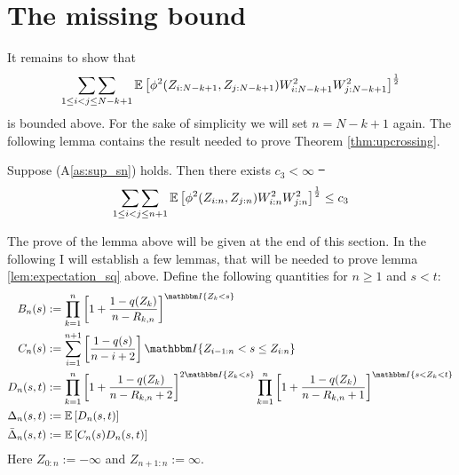 \section{The missing bound}
	It remains to show that 
	$$\mathop{\sum\sum}\limits_{1\leq i<j\leq N-k+1}\mathbb{E}\left[\phi^2(Z_{i:N-k+1}, Z_{j:N-k+1}) W^2_{i:N-k+1} W^2_{j:N-k+1}\right]^{\frac{1}{2}}$$
	is bounded above.	
	For the sake of simplicity we will set $n=N-k+1$ again. The following lemma contains the result needed to prove Theorem \ref{thm:upcrossing}.
\begin{lemma}
	Suppose (A\ref{as:sup_sn}) holds. Then there exists $c_3 < \infty$ \st\ 
	$$\mathop{\sum\sum}\limits_{1\leq i<j\leq n+1}\mathbb{E}\left[\phi^2(Z_{i:n}, Z_{j:n}) W^2_{i:n} W^2_{j:n}\right]^{\frac{1}{2}} \leq c_3 $$	
	\label{lem:expectation_sq}
\end{lemma}	
\noindent The prove of the lemma above will be given at the end of this section. In the following I will establish a few lemmas, that will be needed to prove lemma \ref{lem:expectation_sq} above. Define the following quantities for $n\geq 1$ and $s < t$:
\begin{align*}
	B_n(s) &:= \prod_{k=1}^{n}\left[1+\frac{1-q(Z_{k})}{n-R_{k,n}}\right]^{\I{Z_{k} < s}}\\
	C_n(s) &:= \sum_{i=1}^{n+1}\left[\frac{1-q(s)}{n-i+2}\right]\I{Z_{i-1:n} < s \leq Z_{i:n}}\\
	D_n(s,t) &:= \prod_{k=1}^{n} \left[1+\frac{1-q(Z_k)}{n-R_{k,n} +2}\right]^{2\I{Z_k<s}} \prod_{k=1}^{n}\left[1+\frac{1-q(Z_k)}{n-R_ {k,n}+1}\right]^{\I{s < Z_k < t}}\\
	\Delta_n(s,t) &:= \E\left[D_n(s,t) \right]\\
	\bar{\Delta}_n(s,t) &:= \E\left[C_n(s)D_n(s,t) \right]
\end{align*}
Here $Z_{0:n} := -\infty$ and $Z_{n+1:n} := \infty$.
%

